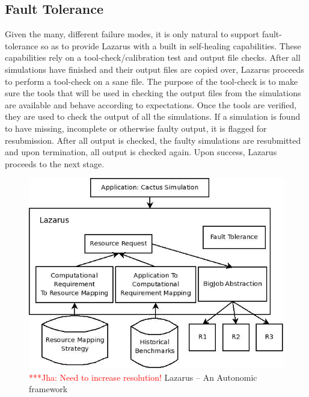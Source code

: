 \documentclass[conference,final]{IEEEtran}
\newcommand{\jhanote}[1]{ {\textcolor{red} { ***Jha: #1 }}}
\newcommand{\jhanote}[1]{}
\begin{document}
\subsection{Fault Tolerance}
Given the many, different failure modes, it is only natural to support
fault-tolerance so as to provide Lazarus with a built in self-healing
capabilities. These capabilities rely on a tool-check/calibration test
and output file checks. After all simulations have finished and their
output files are copied over, Lazarus proceeds to perform a tool-check
on a sane file. The purpose of the tool-check is to make sure the
tools that will be used in checking the output files from the
simulations are available and behave according to expectations. Once
the tools are verified, they are used to check the output of all the
simulations. If a simulation is found to have missing, incomplete or
otherwise faulty output, it is flagged for resubmission.  After all
output is checked, the faulty simulations are resubmitted and upon
termination, all output is checked again. Upon success, Lazarus
proceeds to the next stage.


\begin{figure}
\begin{center}
\includegraphics[scale=0.4]{./figures/Lazarus_01.jpeg}
\end{center}
\caption{\jhanote{Need to increase resolution!}  Lazarus -- An
  Autonomic framework}

\label{fig:application_architecture}
\end{figure}
\end{document}
